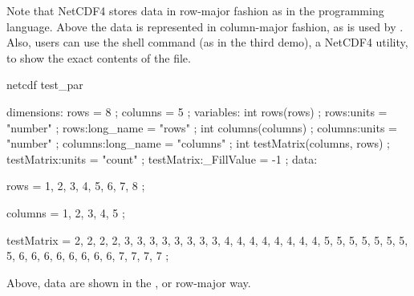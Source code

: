 Note that NetCDF4 stores data in row-major fashion as in the  programming language.  Above the data is represented in column-major fashion, as is used by . Also, users can use the shell command  (as in the third demo), a NetCDF4 utility, to show the exact contents of the  file.
\begin{CodeOutput}[title=Output of \code{ncdump}]
netcdf test_par {
dimensions:
	rows = 8 ;
	columns = 5 ;
variables:
	int rows(rows) ;
		rows:units = "number" ;
		rows:long_name = "rows" ;
	int columns(columns) ;
		columns:units = "number" ;
		columns:long_name = "columns" ;
	int testMatrix(columns, rows) ;
		testMatrix:units = "count" ;
		testMatrix:_FillValue = -1 ;
data:

 rows = 1, 2, 3, 4, 5, 6, 7, 8 ;

 columns = 1, 2, 3, 4, 5 ;

 testMatrix =
  2, 2, 2, 2, 3, 3, 3, 3,
  3, 3, 3, 3, 4, 4, 4, 4,
  4, 4, 4, 4, 5, 5, 5, 5,
  5, 5, 5, 5, 6, 6, 6, 6,
  6, 6, 6, 6, 7, 7, 7, 7 ;
}
\end{CodeOutput}
Above, data are shown in the , or row-major way.

